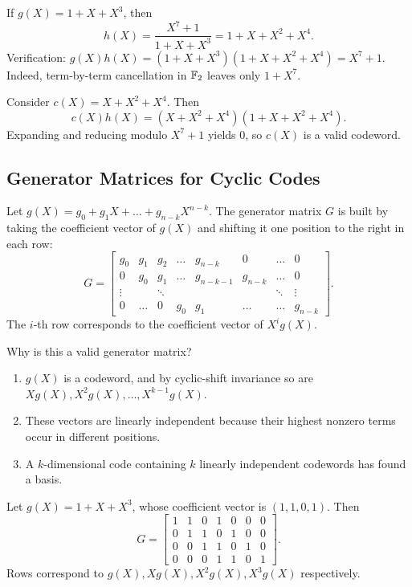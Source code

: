 \begin{example}
If \(g(X)=1+X+X^3\), then
\[h(X)=\frac{X^7+1}{1+X+X^3}=1+X+X^2+X^4.\]
Verification: \(g(X)h(X)=(1+X+X^3)(1+X+X^2+X^4)=X^7+1\). Indeed, term-by-term cancellation in \(\mathbb{F}_2\) leaves only \(1+X^7\).
\end{example}

\begin{example}
Consider \(c(X)=X+X^2+X^4\). Then
\[c(X)h(X) = (X+X^2+X^4)(1+X+X^2+X^4).\]
Expanding and reducing modulo \(X^7+1\) yields 0, so \(c(X)\) is a valid codeword.
\end{example}

\newpage
\subsection{Generator Matrices for Cyclic Codes}

Let \(g(X)=g_0+g_1X+\dots+g_{n-k}X^{n-k}\). The generator matrix \(G\) is built by taking the coefficient vector of \(g(X)\) and shifting it one position to the right in each row:
\[G = \begin{bmatrix}
g_0 & g_1 & g_2 & \dots & g_{n-k} & 0 & \dots & 0 \\
0 & g_0 & g_1 & \dots & g_{n-k-1} & g_{n-k} & \dots & 0 \\
\vdots & & \ddots & & & & \ddots & \vdots \\
0 & \dots & 0 & g_0 & g_1 & \dots & \dots & g_{n-k}
\end{bmatrix}.\]
The \(i\)-th row corresponds to the coefficient vector of \(X^i g(X)\).

\begin{remark}
Why is this a valid generator matrix?
\begin{enumerate}[(1)]
	\item \(g(X)\) is a codeword, and by cyclic-shift invariance so are \(Xg(X),X^2g(X),\dots,X^{k-1}g(X)\).
	\item These vectors are linearly independent because their highest nonzero terms occur in different positions.
	\item A \(k\)-dimensional code containing \(k\) linearly independent codewords has found a basis.
\end{enumerate}
\end{remark}

\begin{example}
Let \(g(X)=1+X+X^3\), whose coefficient vector is \((1,1,0,1)\). Then
\[G = \begin{bmatrix}
1 & 1 & 0 & 1 & 0 & 0 & 0 \\
0 & 1 & 1 & 0 & 1 & 0 & 0 \\
0 & 0 & 1 & 1 & 0 & 1 & 0 \\
0 & 0 & 0 & 1 & 1 & 0 & 1
\end{bmatrix}.\]
Rows correspond to \(g(X), Xg(X), X^2g(X), X^3g(X)\) respectively.
\end{example}

